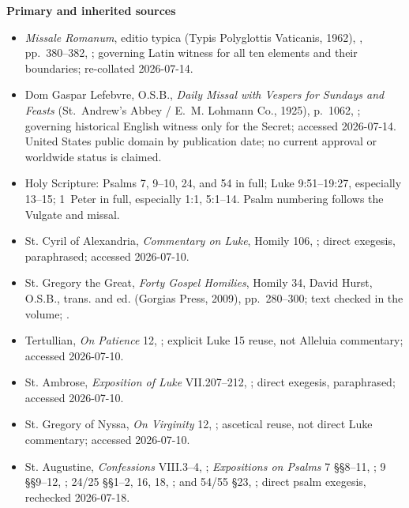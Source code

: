 \textbf{Primary and inherited sources}
{\footnotesize
\begin{itemize}[itemsep=0em,topsep=0.15em,parsep=0pt]
\item \emph{Missale Romanum}, editio typica (Typis Polyglottis Vaticanis, 1962), , pp.~380--382, ; governing Latin witness for all ten elements and their boundaries; re-collated 2026-07-14.
\item Dom Gaspar Lefebvre, O.S.B., \emph{Daily Missal with Vespers for Sundays and Feasts} (St.~Andrew's Abbey / E.~M. Lohmann Co., 1925), p.~1062, ; governing historical English witness only for the Secret; accessed 2026-07-14. United States public domain by publication date; no current approval or worldwide status is claimed.
\item Holy Scripture: Psalms 7, 9--10, 24, and 54 in full; Luke 9:51--19:27, especially 13--15; 1~Peter in full, especially 1:1, 5:1--14. Psalm numbering follows the Vulgate and missal.
\item St. Cyril of Alexandria, \emph{Commentary on Luke}, Homily 106, ; direct exegesis, paraphrased; accessed 2026-07-10.
\item St. Gregory the Great, \emph{Forty Gospel Homilies}, Homily 34, David Hurst, O.S.B., trans. and ed. (Gorgias Press, 2009), pp.~280--300; text checked in the volume; .
\item Tertullian, \emph{On Patience} 12, ; explicit Luke 15 reuse, not Alleluia commentary; accessed 2026-07-10.
\item St. Ambrose, \emph{Exposition of Luke} VII.207--212, ; direct exegesis, paraphrased; accessed 2026-07-10.
\item St. Gregory of Nyssa, \emph{On Virginity} 12, ; ascetical reuse, not direct Luke commentary; accessed 2026-07-10.
\item St. Augustine, \emph{Confessions} VIII.3--4, ; \emph{Expositions on Psalms} 7 §§8--11, ; 9 §§9--12, ; 24/25 §§1--2, 16, 18, ; and 54/55 §23, ; direct psalm exegesis, rechecked 2026-07-18.

\end{itemize}}
